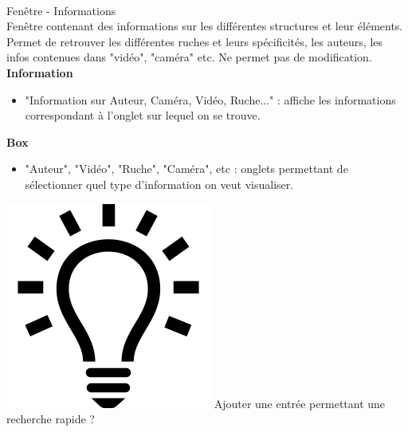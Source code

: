 \documentclass[11pt,french,a4paper]{report}
\begin{document}
\dotfill \\
\Large Fenêtre - Informations \\ \normalsize 
    Fenêtre contenant des informations sur les différentes structures et leur éléments. Permet de retrouver les différentes ruches
    et leurs spécificités, les auteurs, les infos contenues dans "vidéo", "caméra" etc. Ne permet pas de modification. \\
\large \textbf{Information} \normalsize
    \begin{itemize}[label=, leftmargin=*,parsep=0cm,itemsep=0cm,topsep=0cm]
        \item "Information sur Auteur, Caméra, Vidéo, Ruche..." : affiche les informations correspondant à l'onglet sur lequel on se trouve.
    \end{itemize}
\large \textbf{Box} \normalsize
    \begin{itemize}[label=, leftmargin=*,parsep=0cm,itemsep=0cm,topsep=0cm]
        \item "Auteur", "Vidéo", "Ruche", "Caméra", etc : onglets permettant de sélectionner quel type d'information on veut visualiser.
    \end{itemize}
    \includegraphics[scale=0.05]{../images/logo/logo_ampoule} Ajouter une entrée permettant une recherche rapide ? \\

\dotfill \\
\end{document}
